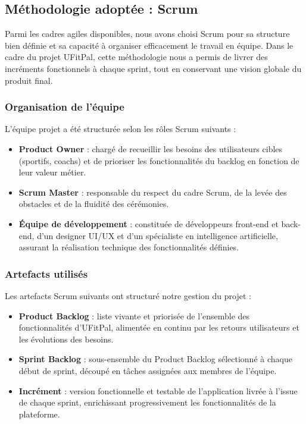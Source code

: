 ﻿\documentclass[a4paper,12pt]{report}
\begin{document}
\subsection{Méthodologie adoptée : Scrum}
Parmi les cadres agiles disponibles, nous avons choisi Scrum pour sa structure bien définie et sa capacité à organiser efficacement le travail en équipe.
 Dans le cadre du projet UFitPal, cette méthodologie nous a permis de livrer des incréments fonctionnels à chaque sprint,
  tout en conservant une vision globale du produit final.

\subsubsection{Organisation de l'équipe}
L'équipe projet a été structurée selon les rôles Scrum suivants :
\begin{itemize}
    \item \textbf{Product Owner} : chargé de recueillir les besoins des utilisateurs cibles 
    (sportifs, coachs) et de prioriser les fonctionnalités du backlog en fonction de leur 
    valeur métier.
    \item \textbf{Scrum Master} : responsable du respect du cadre Scrum, de la levée des 
    obstacles et de la fluidité des cérémonies.
    \item \textbf{Équipe de développement} : constituée de développeurs front-end et back-end, 
    d'un designer UI/UX et d'un spécialiste en intelligence artificielle, assurant la 
    réalisation technique des fonctionnalités définies.
\end{itemize}

\subsubsection{Artefacts utilisés}
Les artefacts Scrum suivants ont structuré notre gestion du projet :
\begin{itemize}
    \item \textbf{Product Backlog} : liste vivante et priorisée de l'ensemble des 
    fonctionnalités d'UFitPal, alimentée en continu par les retours utilisateurs et les 
    évolutions des besoins.
    \item \textbf{Sprint Backlog} : sous-ensemble du Product Backlog sélectionné à chaque 
    début de sprint, découpé en tâches assignées aux membres de l'équipe.
    \item \textbf{Incrément} : version fonctionnelle et testable de l'application livrée 
    à l'issue de chaque sprint, enrichissant progressivement les fonctionnalités de la 
    plateforme.
\end{itemize}
\end{document}
